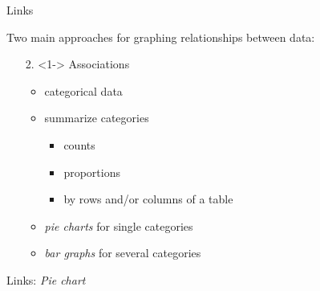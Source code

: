 \documentclass[ignorenonframetext,t]{beamer}
\newenvironment{Shaded}{\begin{snugshade}}{\end{snugshade}}
\newcommand{\KeywordTok}[1]{\textcolor[rgb]{0.13,0.29,0.53}{\textbf{#1}}}
\newcommand{\StringTok}[1]{\textcolor[rgb]{0.31,0.60,0.02}{#1}}
\newcommand{\CommentTok}[1]{\textcolor[rgb]{0.56,0.35,0.01}{\textit{#1}}}
\newcommand{\OperatorTok}[1]{\textcolor[rgb]{0.81,0.36,0.00}{\textbf{#1}}}
\newcommand{\NormalTok}[1]{#1}
\begin{document}
\begin{frame}{Links}

Two main approaches for graphing relationships between data:

\begin{itemize}
\item[2.]<1-> Associations
  \begin{itemize}
  \item<1-> categorical data
  \item<1-> summarize categories
    \begin{itemize}
    \item<1-> counts
    \item<1-> proportions
    \item<1-> by rows and/or columns of a table
  \end{itemize}
  \item<1-> \emph{pie charts} for single categories 
  \item<1-> \emph{bar graphs} for several categories
  \end{itemize}
\end{itemize}

\end{frame}

\begin{frame}[fragile]{Links: \emph{Pie chart}}

\begin{Shaded}
\end{Shaded}


\end{frame}
\end{document}

